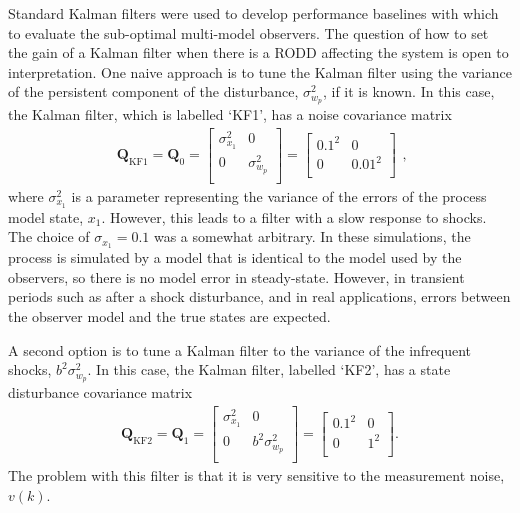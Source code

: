 Standard Kalman filters were used to develop performance baselines with which to evaluate the sub-optimal multi-model observers. The question of how to set the gain of a Kalman filter when there is a \gls{RODD} affecting the system is open to interpretation. One naive approach is to tune the Kalman filter using the variance of the persistent component of the disturbance, $\sigma_{w_p}^2$, if it is known. In this case, the Kalman filter, which is labelled `KF1', has a noise covariance matrix
\begin{equation} \label{eq:sim-sys-siso-KF1-Q}
	\begin{aligned}
		\mathbf{Q}_{\text{KF1}}=\mathbf{Q}_0=\begin{bmatrix}
			\sigma_{x_1}^2 & 0 \\
			0 &  \sigma_{w_p}^2 \\
		\end{bmatrix}=\begin{bmatrix}
		0.1^2 & 0 \\
		0 & 0.01^2 \\
	\end{bmatrix}
	\end{aligned},
\end{equation}
where $\sigma_{x_1}^2$ is a parameter representing the variance of the errors of the process model state, $x_1$. However, this leads to a filter with a slow response to shocks. The choice of $\sigma_{x_1}=0.1$ was a somewhat arbitrary. In these simulations, the process is simulated by a model that is identical to the model used by the observers, so there is no model error in steady-state. However, in transient periods such as after a shock disturbance, and in real applications, errors between the observer model and the true states are expected.

A second option is to tune a Kalman filter to the variance of the infrequent shocks, $b^2\sigma_{w_p}^2$.  In this case, the Kalman filter, labelled `KF2', has a state disturbance covariance matrix
\begin{equation} \label{eq:sim-sys-siso-KF2-Q}
	\begin{aligned}
		\mathbf{Q}_{\text{KF2}}=\mathbf{Q}_1=\begin{bmatrix}
			\sigma_{x_1}^2 & 0 \\
			0 & b^2\sigma_{w_p}^2 \\
		\end{bmatrix}=\begin{bmatrix}
			0.1^2 & 0 \\
			0 & 1^2 \\
		\end{bmatrix}.
	\end{aligned}
\end{equation}
The problem with this filter is that it is very sensitive to the measurement noise, $v(k)$. 

